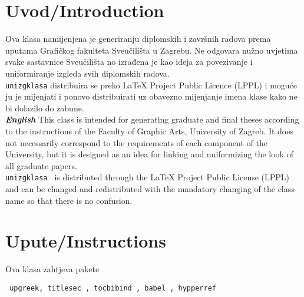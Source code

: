 \documentclass{unizgklasa}
\begin{document}

\prvanaslovna
\druganaslovna

\section{Uvod/Introduction}
Ova klasa namijenjena je generiranju diplomskih i završnih radova prema uputama Grafičkog fakulteta  Sveučilišta u Zagrebu. Ne odgovara nužno uvjetima svake sastavnice Sveučilišta no izrađena je kao ideja za povezivanje i uniformiranje izgleda svih diplomskih radova. \\

\verb=unizgklasa= distribuira se preko LaTeX Project Public Licence (LPPL) i moguće ju je mijenjati i ponovo distribuirati uz obavezno mijenjanje imena klase kako ne bi dolazilo do zabune. \\

\textit{\textbf{English}}
This class is intended for generating graduate and final theses according to the instructions of the Faculty of Graphic Arts, University of Zagreb. It does not necessarily correspond to the requirements of each component of the University, but it is designed as an idea for linking and uniformizing the look of all graduate papers.\\

\verb=unizgklasa = is distributed through the LaTeX Project Public License (LPPL) and can be changed and redistributed with the mandatory changing of the class name so that there is no confusion.

\section{Upute/Instructions}

Ova klasa zahtjeva pakete  \begin{verbatim} upgreek, titlesec , tocbibind , babel , hypperref
\end{verbatim}
\end{document}
